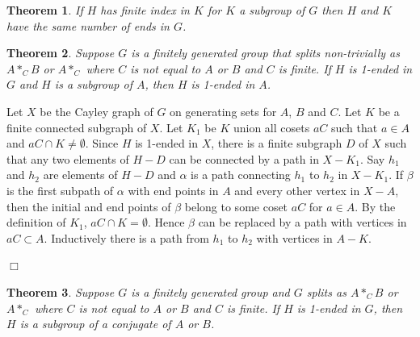 \documentclass[12pt]{article}
\newtheorem{theorem}{Theorem}[subsection]
\newenvironment{proof}{\addvspace{12pt}\noindent{\bf Proof:}}{
$\Box$\par\addvspace{12pt}}
\begin{document}
\begin{theorem}\label{FI}
If $H$ has finite index in $K$ for $K$ a subgroup of $G$ then $H$ and $K$ have the same number of ends in $G$. 
\end{theorem}

\begin{theorem}
Suppose $G$ is a finitely generated group that splits non-trivially as  $A\ast_C B$ or $A\ast_C$ where $C$ is not equal to $A$ or $B$ and $C$ is finite. If $H$ is 1-ended in $G$ and $H$ is a subgroup of $A$, then $H$ is 1-ended in $A$.  
\end{theorem}
\begin{proof}
Let $X$ be the Cayley graph of $G$ on generating sets for $A$, $B$ and $C$. Let $K$ be a finite connected subgraph of $X$. Let $K_1$ be $K$ union all cosets $aC$ such that $a\in A$ and $aC\cap K\ne\emptyset$. Since $H$ is 1-ended in $X$, there is a finite subgraph $D$ of $X$ such that any two elements of $H-D$ can be connected by a path in $X-K_1$. Say $h_1$ and $h_2$ are elements of $H-D$ and $\alpha$ is a path connecting $h_1$ to $h_2$ in $X-K_1$. If $\beta$ is the first subpath of $\alpha$ with end points in $A$ and every other vertex in $X-A$, then the initial and end points of $\beta$ belong to some coset $aC$ for $a\in A$. By the definition of $K_1$, $aC\cap K=\emptyset$. Hence $\beta$ can be replaced by a path with vertices in $aC\subset A$. Inductively there is a path from $h_1$ to $h_2$ with vertices in $A-K$. 
\end{proof}

\begin{theorem} \label{OneEndSplit} 
Suppose $G$ is a finitely generated group and $G$ splits as $A\ast_C B$ or $A\ast_C$ where $C$ is not equal to $A$ or $B$ and $C$ is finite. If $H$ is 1-ended in $G$, then $H$ is a subgroup of a conjugate of $A$ or $B$. 
\end{theorem}
\end{document}
